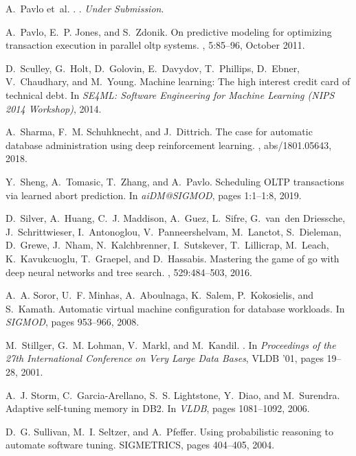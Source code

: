 \documentclass[11pt,times]{article}
\begin{document}
\begin{thebibliography}{10}
A.~Pavlo et~al.
.
.
\newblock \textit{Under Submission}.

A.~Pavlo, E.~P. Jones, and S.~Zdonik.
\newblock On predictive modeling for optimizing transaction execution in
  parallel oltp systems.
, 5:85--96, October 2011.

D.~Sculley, G.~Holt, D.~Golovin, E.~Davydov, T.~Phillips, D.~Ebner,
  V.~Chaudhary, and M.~Young.
\newblock Machine learning: The high interest credit card of technical debt.
\newblock In {\em SE4ML: Software Engineering for Machine Learning (NIPS 2014
  Workshop)}, 2014.

A.~Sharma, F.~M. Schuhknecht, and J.~Dittrich.
\newblock The case for automatic database administration using deep
  reinforcement learning.
, abs/1801.05643, 2018.

Y.~Sheng, A.~Tomasic, T.~Zhang, and A.~Pavlo.
\newblock Scheduling {OLTP} transactions via learned abort prediction.
\newblock In {\em aiDM@SIGMOD}, pages 1:1--1:8, 2019.

D.~Silver, A.~Huang, C.~J. Maddison, A.~Guez, L.~Sifre, G.~van~den Driessche,
  J.~Schrittwieser, I.~Antonoglou, V.~Panneershelvam, M.~Lanctot, S.~Dieleman,
  D.~Grewe, J.~Nham, N.~Kalchbrenner, I.~Sutskever, T.~Lillicrap, M.~Leach,
  K.~Kavukcuoglu, T.~Graepel, and D.~Hassabis.
\newblock Mastering the game of go with deep neural networks and tree search.
, 529:484--503, 2016.

A.~A. Soror, U.~F. Minhas, A.~Aboulnaga, K.~Salem, P.~Kokosielis, and
  S.~Kamath.
\newblock Automatic virtual machine configuration for database workloads.
\newblock In {\em SIGMOD}, pages 953--966, 2008.

M.~Stillger, G.~M. Lohman, V.~Markl, and M.~Kandil.
.
\newblock In {\em Proceedings of the 27th International Conference on Very
  Large Data Bases}, VLDB '01, pages 19--28, 2001.

A.~J. Storm, C.~Garcia-Arellano, S.~S. Lightstone, Y.~Diao, and M.~Surendra.
\newblock Adaptive self-tuning memory in {DB2}.
\newblock In {\em VLDB}, pages 1081--1092, 2006.

D.~G. Sullivan, M.~I. Seltzer, and A.~Pfeffer.
\newblock Using probabilistic reasoning to automate software tuning.
\newblock SIGMETRICS, pages 404--405, 2004.


\end{thebibliography}
\end{document}
